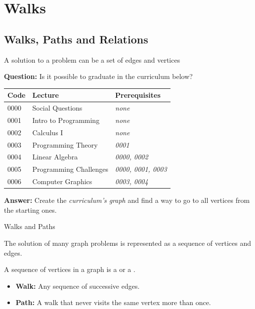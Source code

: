 \section{Walks}


\subsection{Walks, Paths and Relations}

\begin{frame}[t]{A solution to a problem can be a set of edges and vertices}

{\bf Question:} Is it possible to graduate in the curriculum below?
\begin{tabular}{p{}|p{}||p{}}
  \hline
  Code & Lecture & Prerequisites \\
  \hline
  0000 & {\small Social Questions} & \emph{none} \\
  0001 & {\small Intro to Programming} & \emph{none} \\
  0002 & {\small Calculus I} & \emph{none} \\
  0003 & {\small Programming Theory} & \emph{0001} \\
  0004 & {\small Linear Algebra} & \emph{0000, 0002} \\
  0005 & {\small Programming Challenges} & \emph{0000, 0001, 0003} \\
  0006 & {\small Computer Graphics} & \emph{0003, 0004} \\
  \hline
\end{tabular}\bigskip 

{\bf Answer:} Create the \emph{curriculum's graph} and find a way to go to all vertices from the starting ones.


\end{frame}


\begin{frame}[t]{Walks and Paths}

  The solution of many graph problems is represented as a sequence of vertices and edges.\bigskip 

  A sequence of vertices in a graph is a  or a .\bigskip

  \begin{itemize}
    \item {\bf Walk:} Any sequence of successive edges. 

    \item {\bf Path:} A walk that never visits the same vertex more than once.
  \end{itemize}
\end{frame}

